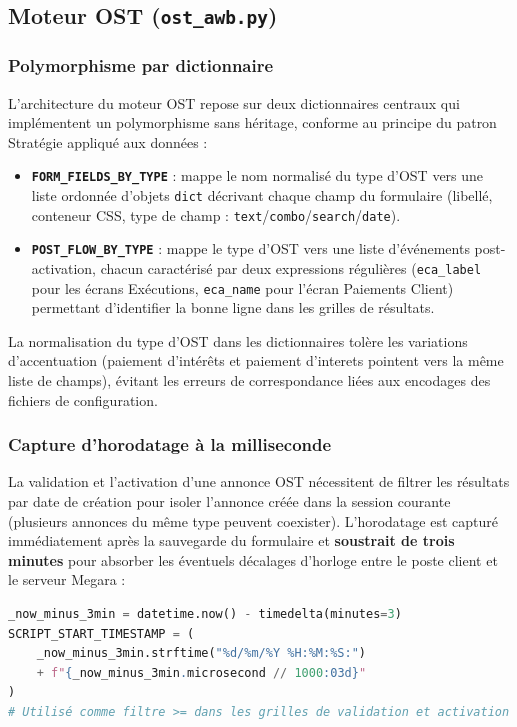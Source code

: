 \documentclass[12pt, a4paper]{report}
\begin{document}
\subsection{Moteur OST (\texttt{ost\_awb.py})}

\subsubsection{Polymorphisme par dictionnaire}

L'architecture du moteur OST repose sur deux dictionnaires centraux qui implémentent un polymorphisme sans héritage, conforme au principe du patron Stratégie appliqué aux données :

\begin{itemize}
  \item \textbf{\texttt{FORM\_FIELDS\_BY\_TYPE}} : mappe le nom normalisé du type d'OST vers une liste ordonnée d'objets \texttt{dict} décrivant chaque champ du formulaire (libellé, conteneur CSS, type de champ : \texttt{text}/\texttt{combo}/\texttt{search}/\texttt{date}).
  \item \textbf{\texttt{POST\_FLOW\_BY\_TYPE}} : mappe le type d'OST vers une liste d'événements post-activation, chacun caractérisé par deux expressions régulières (\texttt{eca\_label} pour les écrans Exécutions, \texttt{eca\_name} pour l'écran Paiements Client) permettant d'identifier la bonne ligne dans les grilles de résultats.
\end{itemize}

La normalisation du type d'OST dans les dictionnaires tolère les variations d'accentuation (\og{}paiement d'intérêts\fg{} et \og{}paiement d'interets\fg{} pointent vers la même liste de champs), évitant les erreurs de correspondance liées aux encodages des fichiers de configuration.

\subsubsection{Capture d'horodatage à la milliseconde}

La validation et l'activation d'une annonce OST nécessitent de filtrer les résultats par date de création pour isoler l'annonce créée dans la session courante (plusieurs annonces du même type peuvent coexister). L'horodatage est capturé immédiatement après la sauvegarde du formulaire et \textbf{soustrait de trois minutes} pour absorber les éventuels décalages d'horloge entre le poste client et le serveur Megara :

\begin{mdframed}[backgroundcolor=codeGray, linewidth=0pt, innerleftmargin=8pt]
\begin{lstlisting}[language=Python, basicstyle=\ttfamily\scriptsize]
_now_minus_3min = datetime.now() - timedelta(minutes=3)
SCRIPT_START_TIMESTAMP = (
    _now_minus_3min.strftime("%d/%m/%Y %H:%M:%S:")
    + f"{_now_minus_3min.microsecond // 1000:03d}"
)
# Utilisé comme filtre >= dans les grilles de validation et activation
\end{lstlisting}
\end{mdframed}
\end{document}
